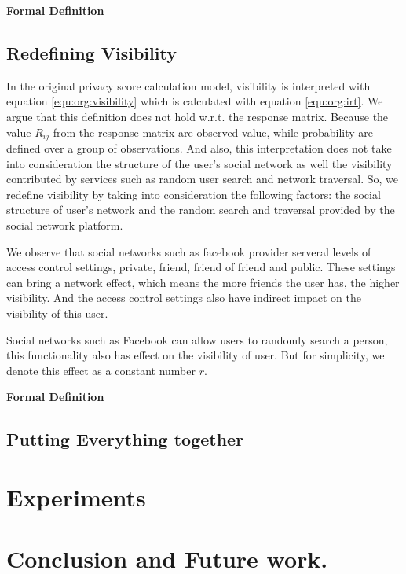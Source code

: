 \documentclass[a4paper]{article}
\begin{document}
\textbf{Formal Definition}

\subsection{Redefining Visibility}
In the original privacy score calculation model, visibility is
interpreted with equation \ref{equ:org:visibility} which is calculated
with equation \ref{equ:org:irt}. We argue that this definition does
not hold w.r.t. the response matrix. Because the value $R_{ij}$ from
the response matrix are observed value, while probability are defined
over a group of observations. And also, this interpretation does not
take into consideration the structure of the user's social network as
well the visibility contributed by services such as random user search
and network traversal. So, we redefine visibility by taking into
consideration the following factors: the social structure of user's
network and the random search and traversal provided by the social
network platform.

We observe that social networks such as facebook provider serveral
levels of access control settings, private, friend, friend of friend
and public. These settings can bring a network
effect, which means the more friends the user
has, the higher visibility. And the access control settings also have
indirect impact on the visibility of this user. 

Social networks such as Facebook can allow users to randomly search a
person, this functionality also has effect on the visibility of
user. But for simplicity, we denote this effect as a constant number
$r$. 

\textbf{Formal Definition}

\subsection{Putting Everything together}

\section{Experiments}

\section{Conclusion and Future work.}



\end{document}
